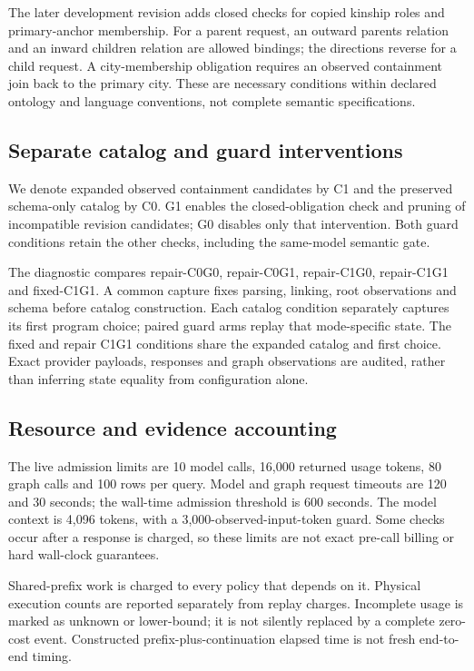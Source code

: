 \documentclass[10pt]{article}
\begin{document}
The later development revision adds closed checks for copied kinship roles and primary-anchor membership. For a parent request, an outward parents relation and an inward children relation are allowed bindings; the directions reverse for a child request. A city-membership obligation requires an observed containment join back to the primary city. These are necessary conditions within declared ontology and language conventions, not complete semantic specifications.\par

\subsection{Separate catalog and guard interventions}

We denote expanded observed containment candidates by C1 and the preserved schema-only catalog by C0. G1 enables the closed-obligation check and pruning of incompatible revision candidates; G0 disables only that intervention. Both guard conditions retain the other checks, including the same-model semantic gate.\par

The diagnostic compares repair-C0G0, repair-C0G1, repair-C1G0, repair-C1G1 and fixed-C1G1. A common capture fixes parsing, linking, root observations and schema before catalog construction. Each catalog condition separately captures its first program choice; paired guard arms replay that mode-specific state. The fixed and repair C1G1 conditions share the expanded catalog and first choice. Exact provider payloads, responses and graph observations are audited, rather than inferring state equality from configuration alone.\par

\subsection{Resource and evidence accounting}

The live admission limits are 10 model calls, 16,000 returned usage tokens, 80 graph calls and 100 rows per query. Model and graph request timeouts are 120 and 30 seconds; the wall-time admission threshold is 600 seconds. The model context is 4,096 tokens, with a 3,000-observed-input-token guard. Some checks occur after a response is charged, so these limits are not exact pre-call billing or hard wall-clock guarantees.\par

Shared-prefix work is charged to every policy that depends on it. Physical execution counts are reported separately from replay charges. Incomplete usage is marked as unknown or lower-bound; it is not silently replaced by a complete zero-cost event. Constructed prefix-plus-continuation elapsed time is not fresh end-to-end timing.\par
\end{document}
